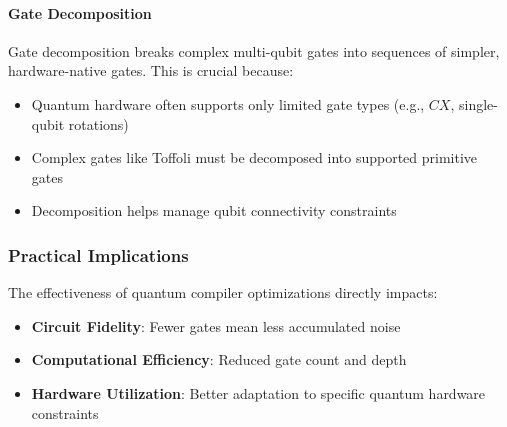 

\paragraph{Gate Decomposition}
Gate decomposition breaks complex multi-qubit gates into sequences of
simpler, hardware-native gates. This is crucial because:

\begin{itemize}
  \item Quantum hardware often supports only limited gate types (e.g., $CX$,
    single-qubit rotations)

  \item Complex gates like Toffoli must be decomposed into supported
    primitive gates

  \item Decomposition helps manage qubit connectivity constraints
\end{itemize}


\subsubsection*{Practical Implications}

The effectiveness of quantum compiler optimizations directly impacts:

\begin{itemize}
  \item \textbf{Circuit Fidelity}: Fewer gates mean less accumulated noise

  \item \textbf{Computational Efficiency}: Reduced gate count and depth

  \item \textbf{Hardware Utilization}: Better adaptation to specific quantum
    hardware constraints
\end{itemize}



